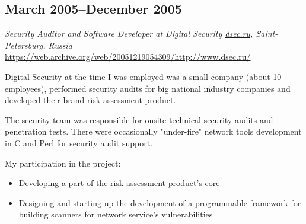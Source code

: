\subsection*{March 2005--December 2005}

\textit{Security Auditor and Software Developer at Digital Security \href{https://dsec.ru}{\url{dsec.ru}}, Saint-Petersburg, Russia}
\href{https://web.archive.org/web/20051219054309/http://www.dsec.ru/}{\url{https://web.archive.org/web/20051219054309/http://www.dsec.ru/}}

Digital Security at the time I was employed was a small company (about 10 employees), performed security audits for big national industry
 companies and developed their brand risk assessment product.

The security team was responsible for onsite technical security audits and penetration tests. There were occasionally "under-fire" network
 tools development in C and Perl for security audit support.

My participation in the project:
\begin{itemize}[noitemsep, nosep]
  \item Developing a part of the risk assessment product's core
  \item Designing and starting up the development of a programmable framework for building scanners for network service's vulnerabilities
\end{itemize}
